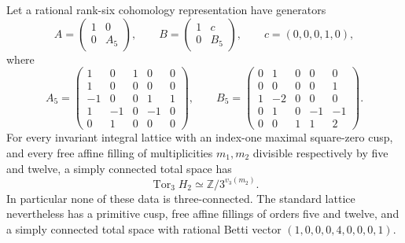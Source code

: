 \begin{theorem}\label{maps:src:F.2.12}


Let a rational rank-six cohomology representation have generators
\[
 A=\begin{pmatrix}1&0\\0&A_5\end{pmatrix},\qquad
 B=\begin{pmatrix}1&c\\0&B_5\end{pmatrix},\qquad
 c=(0,0,0,1,0),
\]
where
\[
 A_5=\begin{pmatrix}
 1&0&1&0&0\\1&0&0&0&0\\-1&0&0&1&1\\
 1&-1&0&-1&0\\0&1&0&0&0
 \end{pmatrix},\qquad
 B_5=\begin{pmatrix}
 0&1&0&0&0\\0&0&0&0&1\\1&-2&0&0&0\\
 0&1&0&-1&-1\\0&0&1&1&2
 \end{pmatrix}.
 \tag{F.33}\label{maps:eq:F.33}
\]
For every invariant integral lattice with an index-one maximal
square-zero cusp, and every free affine filling of multiplicities
$m_1,m_2$ divisible respectively by five and twelve, a simply
connected total space has
\[
 \operatorname{Tor}_3 H_2
       \simeq\mathbb Z/3^{v_3(m_2)}.
 \tag{F.34}\label{maps:eq:F.34}
\]
In particular none of these data is three-connected.
The standard lattice nevertheless has a primitive cusp,
free affine fillings of orders five and twelve, and a simply
connected total space with rational Betti vector
$(1,0,0,0,4,0,0,0,1)$.

\end{theorem}


